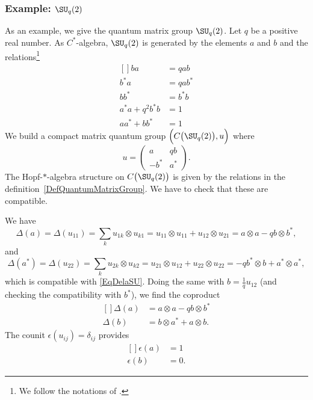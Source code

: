 \subsubsection{Example: \texorpdfstring{$\SU_q(2)$}{SU2}}

As an example, we give the quantum matrix group $\SU_q(2)$. Let $q$ be a positive real number. As $C^*$-algebra, $\SU_q(2)$ is generated by the elements $a$ and $b$ and the relations\footnote{We follow the notations of \cite{DiracSUq}.}
\begin{equation}        \label{EqDefAlfSUab}
	\begin{aligned}[]
		ba        & =qab  \\  b^*a&=qab^*\\
		bb^*      & =b^*b \\  a^*a+q^2b^*b&=1\\
		aa^*+bb^* & =1
	\end{aligned}
\end{equation}
We build a compact matrix quantum group $\Big( C\big( \SU_q(2) \big),u \Big)$ where
\begin{equation}
	u=\begin{pmatrix}
		a    & qb  \\
		-b^* & a^*
	\end{pmatrix}.
\end{equation}
The Hopf-$*$-algebra structure on $C\big( \SU_q(2) \big)$ is given by the relations in the definition~\ref{DefQuantumMatrixGroup}. We have to check that these are compatible.

We have
\begin{equation}        \label{EqDelaSU}
	\Delta(a)=\Delta(u_{11})=\sum_k u_{1k}\otimes u_{k1}=u_{11}\otimes u_{11}+u_{12}\otimes u_{21}=a\otimes a-qb\otimes b^*,
\end{equation}
and
\begin{equation}
	\Delta(a^*)=\Delta(u_{22})=\sum_k u_{2k}\otimes u_{k2}=u_{21}\otimes u_{12}+u_{22}\otimes u_{22}=-qb^*\otimes b+a^*\otimes a^*,
\end{equation}
which is compatible with \eqref{EqDelaSU}. Doing the same with $b=\frac{1}{ q }u_{12}$ (and checking the compatibility with $b^*$), we find the coproduct
\begin{equation}
	\begin{aligned}[]
		\Delta(a) & =a\otimes a-qb\otimes b^* \\
		\Delta(b) & =b\otimes a^*+a\otimes b.
	\end{aligned}
\end{equation}
The counit $\epsilon(u_{ij})=\delta_{ij}$ provides
\begin{equation}
	\begin{aligned}[]
		\epsilon(a) & =1  \\
		\epsilon(b) & =0.
	\end{aligned}
\end{equation}

